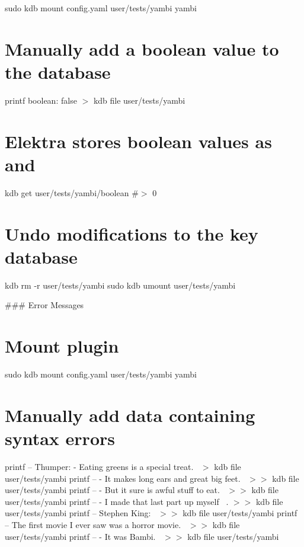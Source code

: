 sudo kdb mount config.\+yaml user/tests/yambi yambi

\section*{Manually add a boolean value to the database}

printf \textquotesingle{}boolean\+: false\textquotesingle{} $>$ {\ttfamily kdb file user/tests/yambi}

\section*{Elektra stores boolean values as {} and {}}

kdb get user/tests/yambi/boolean \#$>$ 0

\section*{Undo modifications to the key database}

kdb rm -\/r user/tests/yambi sudo kdb umount user/tests/yambi 
\begin{DoxyCode}
### Error Messages
\end{DoxyCode}
 \section*{Mount plugin}

sudo kdb mount config.\+yaml user/tests/yambi yambi

\section*{Manually add data containing syntax errors}

printf -- \textquotesingle{}Thumper\+: -\/ Eating greens is a special treat.~\newline
\textquotesingle{} $>$ {\ttfamily kdb file user/tests/yambi} printf -- \textquotesingle{} -\/ It makes long ears and great big feet.~\newline
\textquotesingle{} $>$$>$ {\ttfamily kdb file user/tests/yambi} printf -- \textquotesingle{}-\/ But it sure is awful stuff to eat.~\newline
\textquotesingle{} $>$$>$ {\ttfamily kdb file user/tests/yambi} printf -- \textquotesingle{} -\/ I made that last part up myself~\newline
.\textquotesingle{} $>$$>$ {\ttfamily kdb file user/tests/yambi} printf -- \textquotesingle{}Stephen King\+:~\newline
\textquotesingle{} $>$$>$ {\ttfamily kdb file user/tests/yambi} printf -- \textquotesingle{} The first movie I ever saw was a horror movie.~\newline
\textquotesingle{} $>$$>$ {\ttfamily kdb file user/tests/yambi} printf -- \textquotesingle{} -\/ It was Bambi.~\newline
\textquotesingle{} $>$$>$ {\ttfamily kdb file user/tests/yambi}

